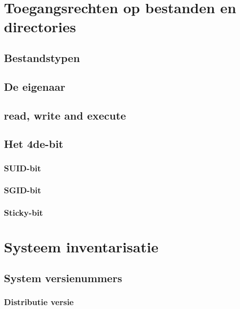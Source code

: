 \documentclass[a4paper,12pt,twoside,openright,titlepage]{book}
\begin{document}
\chapter{Toegangsrechten op bestanden en directories}


\section{Bestandstypen}

\section{De eigenaar}

\section{read, write and execute}


\section{Het 4de-bit}

\subsection{SUID-bit}

\subsection{SGID-bit}

\subsection{Sticky-bit}


\chapter{Systeem inventarisatie}

\section{System versienummers}

\subsection{Distributie versie}

\end{document}
